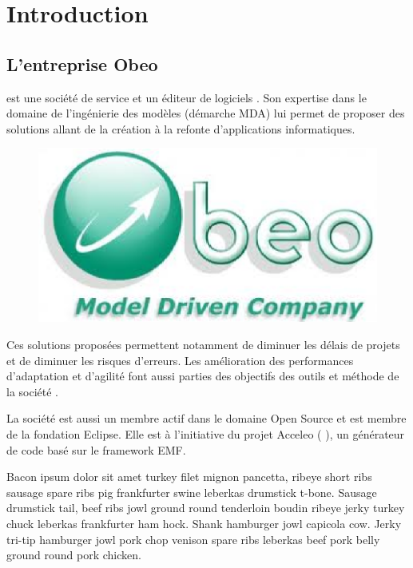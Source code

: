 \chapter{Introduction}\label{chap:Intro}

\section{L'entreprise Obeo}
\kwobeo{} est une société de service et un éditeur de logiciels \cite{obeo}. Son expertise dans le domaine de l'ingénierie des modèles (démarche MDA) lui permet de proposer des solutions allant de la création à la refonte d'applications informatiques. 

\begin{figure}[htb]
  \centering
  \includegraphics[scale=.4]{img/logoobeo.eps}
  \label{fig:obeo}
\end{figure}

Ces solutions proposées permettent notamment de diminuer les délais de projets et de diminuer les risques d'erreurs. Les amélioration des performances d'adaptation et d'agilité font aussi parties des objectifs des outils et méthode de la société \kwobeo{}.

La société \kwobeo{} est aussi un membre actif dans le domaine Open Source et est membre de la fondation Eclipse. Elle est à l'initiative du projet Acceleo (\cf{} \cite{acceleo}), un générateur de code basé sur le framework EMF. 

Bacon ipsum dolor sit amet turkey filet mignon pancetta, ribeye short ribs sausage spare ribs pig frankfurter swine leberkas drumstick t-bone. Sausage drumstick tail, beef ribs jowl ground round tenderloin boudin ribeye jerky turkey chuck leberkas frankfurter ham hock. Shank hamburger jowl capicola cow. Jerky tri-tip hamburger jowl pork chop venison spare ribs leberkas beef pork belly ground round pork chicken.


